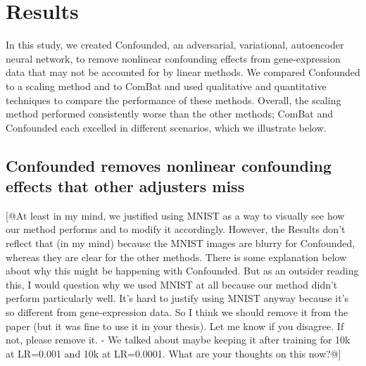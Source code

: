 \documentclass[11pt]{article}
\begin{document}
\section{Results} \label{sec:results}

In this study, we created Confounded, an adversarial, variational, autoencoder neural network, to remove nonlinear confounding effects from gene-expression data that may not be accounted for by linear methods.
We compared Confounded to a scaling method and to ComBat \citep{johnson_adjusting_2007} and used qualitative and quantitative techniques to compare the performance of these methods.
Overall, the scaling method performed consistently worse than the other methods;
ComBat and Confounded each excelled in different scenarios, which we illustrate below.

\subsection{Confounded removes nonlinear confounding effects that other adjusters miss}

[@At least in my mind, we justified using MNIST as a way to visually see how our method performs and to modify it accordingly. However, the Results don't reflect that (in my mind) because the MNIST images are blurry for Confounded, whereas they are clear for the other methods. There is some explanation below about why this might be happening with Confounded. But as an outsider reading this, I would question why we used MNIST at all because our method didn't perform particularly well. It's hard to justify using MNIST anyway because it's so different from gene-expression data. So I think we should remove it from the paper (but it was fine to use it in your thesis). Let me know if you disagree. If not, please remove it. - We talked about maybe keeping it after training for 10k at LR=0.001 and 10k at LR=0.0001. What are your thoughts on this now?@]
\end{document}
